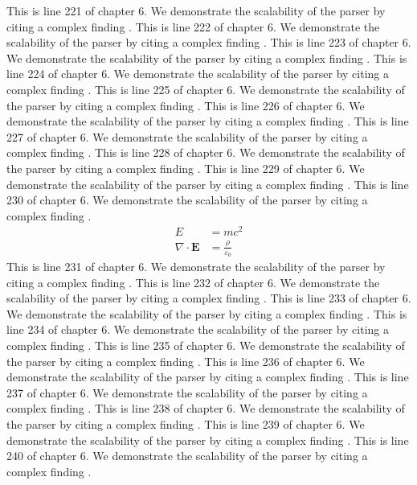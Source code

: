This is line 221 of chapter 6. We demonstrate the scalability of the parser by citing a complex finding \cite{ref6_221}.
This is line 222 of chapter 6. We demonstrate the scalability of the parser by citing a complex finding \cite{ref6_222}.
This is line 223 of chapter 6. We demonstrate the scalability of the parser by citing a complex finding \cite{ref6_223}.
This is line 224 of chapter 6. We demonstrate the scalability of the parser by citing a complex finding \cite{ref6_224}.
This is line 225 of chapter 6. We demonstrate the scalability of the parser by citing a complex finding \cite{ref6_225}.
This is line 226 of chapter 6. We demonstrate the scalability of the parser by citing a complex finding \cite{ref6_226}.
This is line 227 of chapter 6. We demonstrate the scalability of the parser by citing a complex finding \cite{ref6_227}.
This is line 228 of chapter 6. We demonstrate the scalability of the parser by citing a complex finding \cite{ref6_228}.
This is line 229 of chapter 6. We demonstrate the scalability of the parser by citing a complex finding \cite{ref6_229}.
This is line 230 of chapter 6. We demonstrate the scalability of the parser by citing a complex finding \cite{ref6_230}.
\begin{align*}
  E &= mc^2 \\
  \nabla \cdot \mathbf{E} &= \frac{\rho}{\varepsilon_0}
\end{align*}
This is line 231 of chapter 6. We demonstrate the scalability of the parser by citing a complex finding \cite{ref6_231}.
This is line 232 of chapter 6. We demonstrate the scalability of the parser by citing a complex finding \cite{ref6_232}.
This is line 233 of chapter 6. We demonstrate the scalability of the parser by citing a complex finding \cite{ref6_233}.
This is line 234 of chapter 6. We demonstrate the scalability of the parser by citing a complex finding \cite{ref6_234}.
This is line 235 of chapter 6. We demonstrate the scalability of the parser by citing a complex finding \cite{ref6_235}.
This is line 236 of chapter 6. We demonstrate the scalability of the parser by citing a complex finding \cite{ref6_236}.
This is line 237 of chapter 6. We demonstrate the scalability of the parser by citing a complex finding \cite{ref6_237}.
This is line 238 of chapter 6. We demonstrate the scalability of the parser by citing a complex finding \cite{ref6_238}.
This is line 239 of chapter 6. We demonstrate the scalability of the parser by citing a complex finding \cite{ref6_239}.
This is line 240 of chapter 6. We demonstrate the scalability of the parser by citing a complex finding \cite{ref6_240}.
